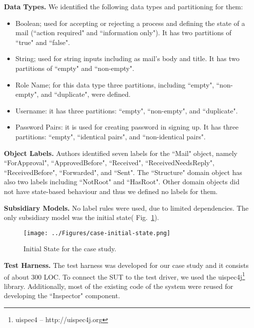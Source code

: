 \textbf{Data Types.}  We identified the following data types and partitioning for them:
\begin{itemize}
	\item Boolean;  used for accepting or rejecting a process and defining the state of a mail (``action required" and ``information only"). It has two partitions of ``true" and ``false".
	
	\item String; used for string inputs including as mail's body and title. It has two partitions of ``empty" and ``non-empty". 
	
	\item Role Name; for this data type three partitions, including ``empty", ``non-empty", and ``duplicate",  were defined.
	
	\item Username: it has three partitions: ``empty", ``non-empty", and ``duplicate".
	
	\item Password Pairs: it is used for creating password in signing up. It has three partitions: ``empty", ``identical pairs", and ``non-identical pairs".
\end{itemize}

 \textbf{Object Labels.} Authors identified seven labels for the ``Mail" object, namely ``ForApproval", ``ApprovedBefore", ``Received", ``ReceivedNeedsReply", ``ReceivedBefore", ``Forwarded", and ``Sent". The ``Structure" domain object has also two labels including ``NotRoot" and ``HasRoot". Other domain objects did not have state-based behaviour and thus we defined no labels for them.

\textbf{Subsidiary Models.} No label rules were used, due to limited dependencies. The only subsidiary model was the initial state( Fig.~\ref{fig:case-initial-state}).

\begin{figure}[h]
\centering
\texttt{[image: ../Figures/case-initial-state.png]}
\caption{Initial State for the case study.}
\label{fig:case-initial-state}
\end{figure}

\textbf{Test Harness.} The test harness was developed for our case study and it consists of about 300 LOC. To connect the SUT to the test driver, we used the uispec4j\footnote{ uispec4 – http://uispec4j.org} library. Additionally, most of the existing code of the system were reused for developing the ``Inspector" component.%
 
